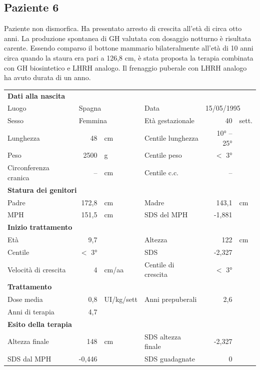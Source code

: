 \subsection*{Paziente 6}%

Paziente non dismorfica. Ha presentato arresto di crescita all'età di circa otto anni. La produzione spontanea di GH valutata con dosaggio notturno è risultata carente. Essendo comparso il bottone mammario bilateralmente all'età di 10 anni circa quando la staura era pari a 126,8 cm, è stata proposta la terapia combinata con GH biosintetico e LHRH analogo. Il frenaggio puberale con LHRH analogo ha avuto durata di un anno.   

\begin{table}[h]
\begin{tabular}{lrllrl}
\toprule
\multicolumn{6}{l}{\textbf{Dati alla nascita}}\\
Luogo 		& \multicolumn{2}{l}{Spagna} 	& Data 					& \multicolumn{2}{l}{15/05/1995} 	\\
Sesso 		& \multicolumn{2}{l}{Femmina} 	& Età gestazionale 		& 40 		& sett.\\
Lunghezza 	& 48 		& cm 				& Centile lunghezza		& 10° -- 25° 		\\
Peso 		& 2500 		& g					& Centile peso			& $<$ 3° 		\\
Circonferenza cranica	& -- 		& cm 	& Centile c.c.			& -- \\
\midrule
\multicolumn{6}{l}{\textbf{Statura dei genitori}}\\
Padre 		& 172,8 & cm 	& Madre 				& 143,1 & cm \\
MPH 		& 151,5 & cm 	& SDS del MPH 			& -1,881\\
\midrule
\multicolumn{6}{l}{\textbf{Inizio trattamento}} \\
Età	& 9,7 & 		& Altezza 				& 122 & cm  \\
Centile & $<$ 3° 	 &		& SDS		& -2,327 \\
Velocità di crescita & 4 & cm/aa	& Centile di crescita & $<$ 3°\\
\midrule
\multicolumn{6}{l}{\textbf{Trattamento}} \\
Dose media		& 0,8 & UI/kg/sett & Anni prepuberali & 2,6\\
Anni di terapia & 4,7\\
\midrule
\multicolumn{6}{l}{\textbf{Esito della terapia}} \\
Altezza finale			& 148 & cm 	& SDS altezza finale		& -2,327\\
SDS dal MPH				& -0,446 &		& SDS guadagnate 			& 0\\
\bottomrule
\end{tabular}
\end{table}
\clearpage

